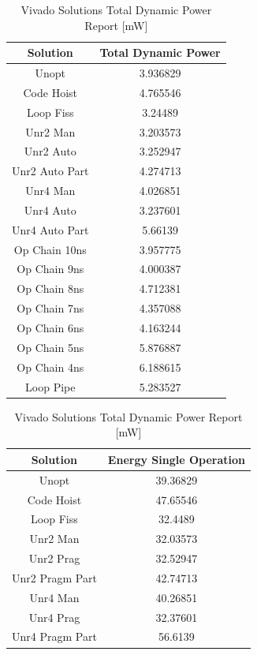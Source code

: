 \begin{table}[H]
	\centering
	\begin{minipage}[t]{0.45\linewidth}
		\centering
		\begin{tabular}{|c|c|}
			\hline
			\textbf{Solution} & \textbf{Total Dynamic Power} \\
			\hline
			Unopt & 3.936829 \\
			Code Hoist & 4.765546 \\
			Loop Fiss & 3.24489 \\
			Unr2 Man & 3.203573 \\
			Unr2 Auto & 3.252947 \\
			Unr2 Auto Part & 4.274713 \\
			Unr4 Man & 4.026851 \\
			Unr4 Auto & 3.237601 \\
			Unr4 Auto Part & 5.66139 \\
			Op Chain 10ns & 3.957775 \\
			Op Chain 9ns & 4.000387 \\
			Op Chain 8ns & 4.712381 \\
			Op Chain 7ns & 4.357088 \\
			Op Chain 6ns & 4.163244 \\
			Op Chain 5ns & 5.876887 \\
			Op Chain 4ns & 6.188615 \\
			Loop Pipe & 5.283527 \\
			\hline
		\end{tabular}
		\caption{Vivado Solutions Total Dynamic Power Report [mW]}
		\label{tab:vivado-solutions-total-dynamic-power-report}
	\end{minipage}
	\hfill
	\centering
	\begin{minipage}[t]{0.45\linewidth}
		\centering
		\begin{tabular}{|c|c|}
			\hline
			\textbf{Solution} & \textbf{Energy Single Operation} \\
			\hline
			Unopt & 39.36829 \\
			Code Hoist & 47.65546 \\
			Loop Fiss & 32.4489 \\
			Unr2 Man & 32.03573 \\
			Unr2 Prag & 32.52947 \\
			Unr2 Pragm Part & 42.74713 \\
			Unr4 Man & 40.26851 \\
			Unr4 Prag & 32.37601 \\
			Unr4 Pragm Part & 56.6139 \\

\end{tabular}
\end{minipage}
\end{table}
